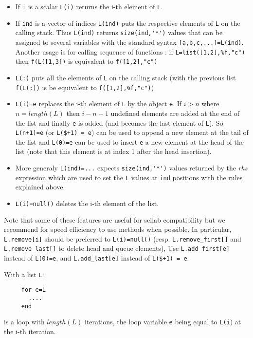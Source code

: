 \begin{itemize}
   \item If \verb+i+ is a scalar \verb+L(i)+ returns the i-th element of \verb+L+.
   \item If \verb+ind+ is a vector of indices \verb+L(ind)+ 
     puts the respective elements of \verb+L+ on the 
     calling stack. Thus \verb+L(ind)+ returns \verb+size(ind,'*')+ values that 
     can be assigned to several variables with the standard syntax \verb+[a,b,c,...]=L(ind)+. 
     Another usage is for calling sequence of functions : if \verb+L=list([1,2],%f,"c")+
     then  \verb+f(L([1,3])+ is equivalent to  \verb+f([1,2],"c")+
   \item \verb+L(:)+ puts all the elements of \verb+L+ on the calling stack
     (with the previous list  \verb+f(L(:))+ is be equivalent to \verb+f([1,2],%f,"c")+)
   \item \verb+L(i)=e+ replaces the i-th element of \verb+L+ by
     the object \verb+e+. If $i > n$ where $n=length(L)$ then $i-n-1$ undefined
     elements are added at the end of the list and finally \verb+e+
     is added (and becomes the last element of \verb+L+). 
     So \verb-L(n+1)=e- (or \verb-L($+1) = e-) can be used to append a new element at the tail of the list 
     and \verb+L(0)=e+ can be used to insert \verb+e+ a new element at the head of the list 
     (note that this element is at index 1 after the head insertion).
   \item More generaly \verb+L(ind)=...+ expects \verb+size(ind,'*')+ values returned 
     by the {\em rhs} expression which are used to set the \verb+L+ values at \verb+ind+ positions with 
     the rules explained above. 
   \item \verb+L(i)=null()+ deletes the i-th element of the list.
\end{itemize}

Note that some of these features are useful for scilab compatibility
but we recommend for speed efficiency to use methods when possible.
In particular, \verb+L.remove[i]+ should be preferred to \verb+L(i)=null()+ 
(resp. \verb+L.remove_first[]+ and \verb+L.remove_last[]+ to delete head and queue elements),
Use \verb+L.add_first[e]+ instead of \verb+L(0)=e+, and \verb+L.add_last[e]+ instead of 
\verb-L($+1) = e-.

With a list \verb+L+:\begin{verbatim}
     for e=L
       ....
     end
\end{verbatim} 
is a loop with $length(L)$ iterations, the loop 
variable  \verb+e+ being equal to \verb+L(i+) at the i-th iteration.


